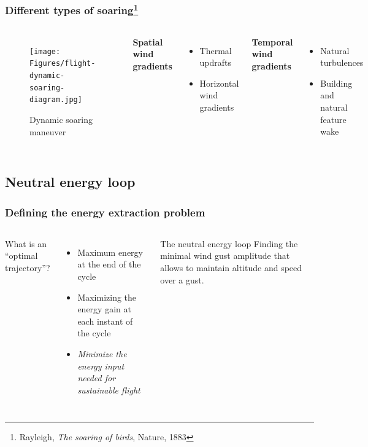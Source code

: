 \documentclass[compress]{beamer}
\begin{document}
\begin{frame}
  \frametitle{Different types of soaring\footnote{\tiny{Rayleigh, \emph{The soaring of birds}, Nature, 1883}}}
  \begin{columns}
    \begin{figure}[ht]
      \centering
      \texttt{[image: Figures/flight-dynamic-soaring-diagram.jpg]} 
      \caption{Dynamic soaring maneuver}
    \end{figure}
    \textbf{Spatial wind gradients}
    \begin{itemize}
      \item Thermal updrafts
      \item Horizontal wind gradients
    \end{itemize}
    \textbf{Temporal wind gradients}
    \begin{itemize}
      \item Natural turbulences
      \item Building and natural feature wake
    \end{itemize}
  \end{columns}
\end{frame}

\subsection{Neutral energy loop}

\begin{frame}
  \frametitle{Defining the energy extraction problem}
  \begin{columns}
    What is an ``optimal trajectory''?
    \begin{itemize}
      \item Maximum energy at the end of the cycle
      \item Maximizing the energy gain at each instant of the cycle
      \item \emph{Minimize the energy input needed for sustainable flight}
    \end{itemize}

    \begin{block}{The neutral energy loop}
      Finding the minimal wind gust amplitude that allows to maintain altitude and speed over a gust. 
    \end{block}
  \end{columns}
\end{frame}
\end{document}
